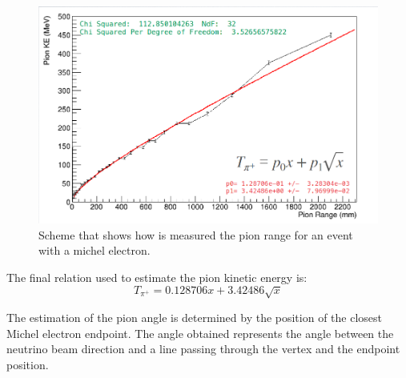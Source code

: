 \begin{figure}[!htb]
    \centering
    \includegraphics[scale=0.33]{Figures/Chapter2/PionEstimator.png}
    \caption{Scheme that shows how is measured the pion range for an event with a michel electron. }
    \label{fig:MnvExp:MnvDetector:DataReconstruction:Untrackedpions:PionEstimator}
\end{figure}

The final relation used to estimate the pion kinetic energy is:
\begin{equation}
    T_{\pi^+} = 0.128706 x+ 3.42486 \sqrt{x}
\end{equation}

The estimation of the pion angle is determined by the position of the closest Michel electron endpoint. The angle obtained represents the angle between the neutrino beam direction and a line passing through the vertex and the endpoint position. 
